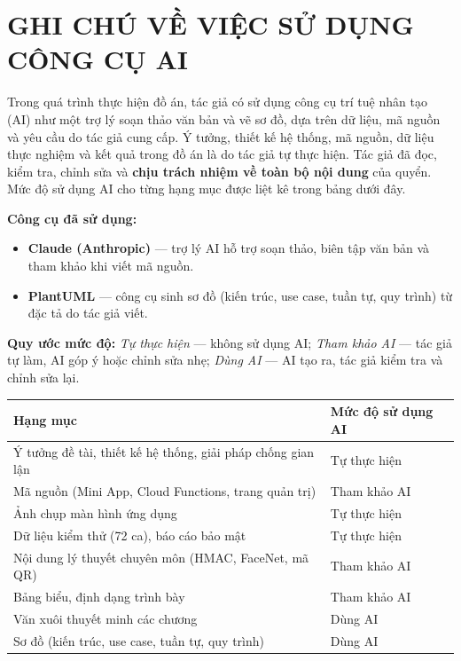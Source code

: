 \documentclass[../main.tex]{subfiles}
\begin{document}
\chapter*{GHI CHÚ VỀ VIỆC SỬ DỤNG CÔNG CỤ AI}
\thispagestyle{plain}

Trong quá trình thực hiện đồ án, tác giả có sử dụng công cụ trí tuệ nhân tạo (AI) như một
trợ lý soạn thảo văn bản và vẽ sơ đồ, dựa trên dữ liệu, mã nguồn và yêu cầu do tác giả cung
cấp. Ý tưởng, thiết kế hệ thống, mã nguồn, dữ liệu thực nghiệm và kết quả trong đồ án là do
tác giả tự thực hiện. Tác giả đã đọc, kiểm tra, chỉnh sửa và \textbf{chịu trách nhiệm về toàn
bộ nội dung} của quyển. Mức độ sử dụng AI cho từng hạng mục được liệt kê trong bảng dưới đây.

\vspace{0.6em}
\noindent\textbf{Công cụ đã sử dụng:}
\begin{itemize}[leftmargin=1.6em,topsep=2pt,itemsep=1pt]
  \item \textbf{Claude (Anthropic)} --- trợ lý AI hỗ trợ soạn thảo, biên tập văn bản và tham
  khảo khi viết mã nguồn.
  \item \textbf{PlantUML} --- công cụ sinh sơ đồ (kiến trúc, use case, tuần tự, quy trình) từ
  đặc tả do tác giả viết.
\end{itemize}

\vspace{0.4em}
\noindent\textbf{Quy ước mức độ:} \textit{Tự thực hiện} --- không sử dụng AI;
\textit{Tham khảo AI} --- tác giả tự làm, AI góp ý hoặc chỉnh sửa nhẹ;
\textit{Dùng AI} --- AI tạo ra, tác giả kiểm tra và chỉnh sửa lại.

\vspace{0.8em}
\begin{center}
\begin{tabular}{|p{9.6cm}|p{3.6cm}|}
\hline
\textbf{Hạng mục} & \textbf{Mức độ sử dụng AI} \\ \hline
Ý tưởng đề tài, thiết kế hệ thống, giải pháp chống gian lận & Tự thực hiện \\ \hline
Mã nguồn (Mini App, Cloud Functions, trang quản trị) & Tham khảo AI \\ \hline
Ảnh chụp màn hình ứng dụng & Tự thực hiện \\ \hline
Dữ liệu kiểm thử (72 ca), báo cáo bảo mật & Tự thực hiện \\ \hline
Nội dung lý thuyết chuyên môn (HMAC, FaceNet, mã QR) & Tham khảo AI \\ \hline
Bảng biểu, định dạng trình bày & Tham khảo AI \\ \hline
Văn xuôi thuyết minh các chương & Dùng AI \\ \hline
Sơ đồ (kiến trúc, use case, tuần tự, quy trình) & Dùng AI \\ \hline
\end{tabular}
\end{center}
\end{document}
